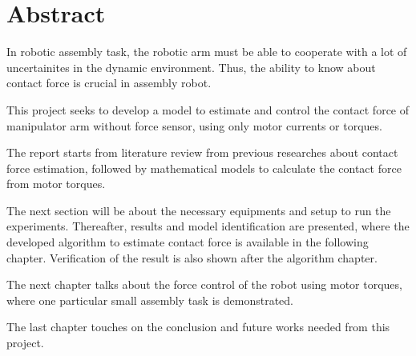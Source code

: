 \chapter*{Abstract}

In robotic assembly task, the robotic arm must be able to cooperate with a lot of uncertainites in the dynamic environment. Thus, the ability to know about contact force is crucial in assembly robot.

This project seeks to develop a model to estimate and control the contact force of manipulator arm without force sensor, using only motor currents or torques.

The report starts from literature review from previous researches about contact force estimation, followed by mathematical models to calculate the contact force from motor torques. 

The next section will be about the necessary equipments and setup to run the experiments. Thereafter, results and model identification are presented, where the developed algorithm to estimate contact force is available in the following chapter. Verification of the result is also shown after the algorithm chapter. 

The next chapter talks about the force control of the robot using motor torques, where one particular small assembly task is demonstrated.

The last chapter touches on the conclusion and future works needed from this project.
